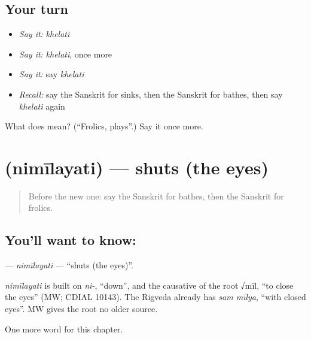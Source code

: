 \subsection*{Your turn}
\begin{itemize}
\raggedright
  \item \emph{Say it:} \emph{khelati}
  \item \emph{Say it:} \emph{khelati}, once more
  \item \emph{Say it:} say \emph{khelati}
  \item \emph{Recall:} say the Sanskrit for sinks, then the Sanskrit for bathes, then say \emph{khelati} again
\end{itemize}

\begin{tcolorbox}[breakable,colback=teal!4,colframe=teal!35!black,title={Before you move on}]
What does  mean? (\textquotedblleft{}Frolics, plays\textquotedblright{}.) Say it once more.
\end{tcolorbox}
\section[\texorpdfstring{\sk{निमीलयति} (nimīlayati)}{निमीलयति (nimīlayati)}]{ (nimīlayati) — shuts (the eyes)}

\label{lesson:SA-C206-nimilayati}



\begin{quote}
Before the new one: say the Sanskrit for bathes, then the Sanskrit for frolics.
\end{quote}

\subsection*{You'll want to know: }
\textbf{} — \emph{nimīlayati} — \textquotedblleft{}shuts (the eyes)\textquotedblright{}.

\begin{cousinweb}
\emph{nimīlayati} is built on \emph{ni-}, \textquotedblleft{}down\textquotedblright{}, and the causative of the root √mīl, \textquotedblleft{}to close the eyes\textquotedblright{} (MW; CDIAL 10143). The Rigveda already has \emph{sam mīlya}, \textquotedblleft{}with closed eyes\textquotedblright{}. MW gives the root no older source.
\end{cousinweb}

\begin{grammarlens}[title={What you've built}]
One more word for this chapter.
\end{grammarlens}

